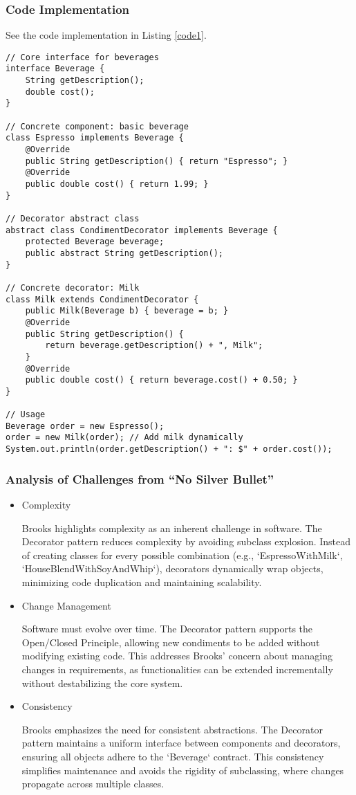 \documentclass[11pt]{article}
\begin{document}
\subsubsection{Code Implementation}
See the code implementation in Listing \ref{code1}.
\begin{lstlisting}[caption=Code implementation of the coffee shop order system., label=code1]
// Core interface for beverages  
interface Beverage {  
    String getDescription();  
    double cost();  
}  

// Concrete component: basic beverage  
class Espresso implements Beverage {  
    @Override  
    public String getDescription() { return "Espresso"; }  
    @Override  
    public double cost() { return 1.99; }  
}  

// Decorator abstract class  
abstract class CondimentDecorator implements Beverage {  
    protected Beverage beverage;  
    public abstract String getDescription();  
}  

// Concrete decorator: Milk  
class Milk extends CondimentDecorator {  
    public Milk(Beverage b) { beverage = b; }  
    @Override  
    public String getDescription() {  
        return beverage.getDescription() + ", Milk";  
    }  
    @Override  
    public double cost() { return beverage.cost() + 0.50; }  
}  

// Usage  
Beverage order = new Espresso();  
order = new Milk(order); // Add milk dynamically  
System.out.println(order.getDescription() + ": $" + order.cost());  
\end{lstlisting}

\subsubsection{Analysis of Challenges from ``No Silver Bullet''}
\begin{itemize}
\item Complexity

Brooks highlights complexity as an inherent challenge in software. The Decorator pattern reduces complexity by avoiding subclass explosion. Instead of creating classes for every possible combination (e.g., `EspressoWithMilk`, `HouseBlendWithSoyAndWhip`), decorators dynamically wrap objects, minimizing code duplication and maintaining scalability.  
\item Change Management
   
   Software must evolve over time. The Decorator pattern supports the Open/Closed Principle, allowing new condiments to be added without modifying existing code. This addresses Brooks’ concern about managing changes in requirements, as functionalities can be extended incrementally without destabilizing the core system.  
\item Consistency
   
   Brooks emphasizes the need for consistent abstractions. The Decorator pattern maintains a uniform interface between components and decorators, ensuring all objects adhere to the `Beverage` contract. This consistency simplifies maintenance and avoids the rigidity of subclassing, where changes propagate across multiple classes.  
\end{itemize}
\end{document}
